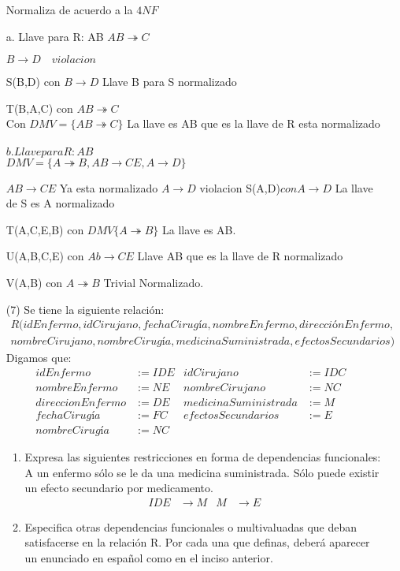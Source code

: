 \documentclass{article}
\begin{document}
\begin{enumerate}
    Normaliza de acuerdo a la $4NF$

    a. Llave para R: AB
    $AB\twoheadrightarrow C$

    $B\rightarrow D \quad violacion$

    S(B,D) con $B \rightarrow D$ Llave B para S normalizado

    T(B,A,C) con $AB\twoheadrightarrow C$\\
    Con $DMV= \{ AB \twoheadrightarrow C\} $ La llave es AB que es la llave de R esta normalizado\\
    \\
    $b. Llave para R: AB$\\
    $DMV= \{A \twoheadrightarrow B, AB\rightarrow CE,  A\rightarrow D \}$

    $AB \rightarrow CE$ Ya esta normalizado
    $A \rightarrow D$ violacion
    S(A,D)$ con A\rightarrow D$ La llave de S es A normalizado

    T(A,C,E,B) con $DMV \{ A \twoheadrightarrow B\}$ La llave es AB.

    U(A,B,C,E) con $Ab \rightarrow CE$ Llave AB que es la llave de R normalizado

    V(A,B) con $A \twoheadrightarrow B$ Trivial Normalizado.
    \item[(7)] Se tiene la siguiente relación:
    \begin{multline*}
      R(idEnfermo,idCirujano,fechaCirugía,nombreEnfermo,direcciónEnfermo, \\
      nombreCirujano,nombreCirugía,medicinaSuministrada,efectosSecundarios)
    \end{multline*}
    Digamos que:
    \begin{align*}
      idEnfermo &:= IDE & idCirujano &:= IDC \\
      nombreEnfermo &:= NE & nombreCirujano &:= NC  \\
      direccionEnfermo &:= DE & medicinaSuministrada &:= M & \\
      fechaCirugía &:= FC & efectosSecundarios &:= E \\
      nombreCirugía &:= NC
    \end{align*}
    \begin{enumerate}
      \item Expresa las siguientes restricciones en forma de dependencias
      funcionales: A un enfermo sólo se le da una medicina suministrada. Sólo
      puede existir un efecto secundario por medicamento.
      \begin{align*}
        IDE &\rightarrow M  & M &\rightarrow E
      \end{align*}
      \item Especifica otras dependencias funcionales o multivaluadas que deban
      satisfacerse en la relación R. Por cada una que definas, deberá aparecer
      un enunciado en español como en el inciso anterior.


\end{enumerate}
\end{enumerate}
\end{document}
